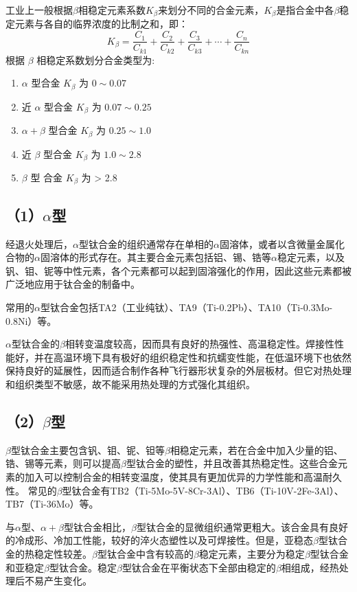 工业上一般根据$\beta$相稳定元素系数$K_{\beta}$来划分不同的合金元素，$K_{\beta}$是指合金中各$\beta$稳定元素与各自的临界浓度的比制之和，即：
\begin{equation}
K_{\beta}=\frac{ C_{1} }{C_{k1}}+\frac{ C_{2} }{C_{k2}}+\frac{ C_{3} }{C_{k3}}+\cdots+\frac{ C_{n} }{C_{kn}}
\end{equation}
根据 $\beta$ 相稳定系数划分合金类型为:
\begin{enumerate}
	\item  $\alpha$ 型合金 $K_\beta$ 为 $0 \sim 0.07$
	\item 近 $\alpha$ 型合金 $K_\beta$ 为 $0.07 \sim 0.25$
	\item $\alpha+\beta$ 型合金 $K_\beta$ 为 $0.25 \sim 1.0$
	\item 近 $\beta$ 型合金 $K_\beta$ 为 $1.0 \sim 2.8$
	\item $\beta$ 型 合金 $K_\beta$ 为 > 2.8
\end{enumerate}
\subsection*{（1）$\alpha$型}
经退火处理后，$\alpha$型钛合金的组织通常存在单相的$\alpha$固溶体，或者以含微量金属化合物的$\alpha$固溶体的形式存在。其主要合金元素包括铝、锡、锆等$\alpha$稳定元素，以及钒、钼、铌等中性元素，各个元素都可以起到固溶强化的作用，因此这些元素都被广泛地应用于钛合金的制备中。

常用的$\alpha$型钛合金包括TA2（工业纯钛）、TA9（Ti-0.2Pb）、TA10（Ti-0.3Mo-0.8Ni）等。

$\alpha$型钛合金的$\beta$相转变温度较高，因而具有良好的热强性、高温稳定性。焊接性性能好，并在高温环境下具有极好的组织稳定性和抗蠕变性能，在低温环境下也依然保持良好的延展性，因而适合制作各种飞行器形状复杂的外层板材。但它对热处理和组织类型不敏感，故不能采用热处理的方式强化其组织\cite{TiandAl}。
\subsection*{（2）$\beta$型}
$\beta$型钛合金主要包含钒、钼、铌、钽等$\beta$相稳定元素，若在合金中加入少量的铝、锆、锡等元素，则可以提高$\beta$型钛合金的塑性，并且改善其热稳定性。这些合金元素的加入可以控制合金的相转变温度，使其具有更加优异的力学性能和高温耐久性。
常见的$\beta$型钛合金有TB2（Ti-5Mo-5V-8Cr-3Al）、TB6（Ti-10V-2Fe-3Al）、TB7（Ti-36Mo）等。

与$\alpha$型、$\alpha+\beta$型钛合金相比，$\beta$型钛合金的显微组织通常更粗大。该合金具有良好的冷成形、冷加工性能，较好的淬火态塑性以及可焊接性。但是，亚稳态$\beta$型钛合金的热稳定性较差。$\beta$型钛合金中含有较高的$\beta$稳定元素，主要分为稳定$\beta$型钛合金和亚稳定$\beta$型钛合金。稳定$\beta$型钛合金在平衡状态下全部由稳定的$\beta$相组成，经热处理后不易产生变化。
